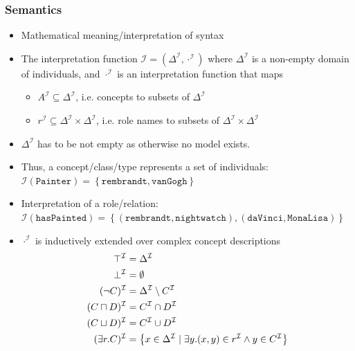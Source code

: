 \subsubsection{Semantics}
\begin{itemize}
	\item Mathematical meaning/interpretation of syntax
	\item The interpretation function $\mathcal{I}=\left(\Delta^{\mathcal{I}}, \cdot^{\mathcal{I}} \right)$ where $\Delta^{\mathcal{I}}$ is a non-empty domain of individuals, and $\cdot^{\mathcal{I}}$ is an interpretation function that maps
	\begin{itemize}
		\item $A^{\mathcal{I}} \subseteq \Delta^{\mathcal{I}}$, i.e. concepts to subsets of $\Delta^{\mathcal{I}}$
		\item $r^{\mathcal{I}} \subseteq \Delta^{\mathcal{I}}\times \Delta^{\mathcal{I}}$, i.e. role names to subsets of $\Delta^{\mathcal{I}}\times\Delta^{\mathcal{I}}$
	\end{itemize}
	\item $\Delta^{\mathcal{I}}$ has to be not empty as otherwise no model exists. 
	\item Thus, a concept/class/type represents a set of individuals: $\mathcal{I}(\texttt{Painter}) = \left\{\texttt{rembrandt}, \texttt{vanGogh}\right\}$
	\item Interpretation of a role/relation: $\mathcal{I}(\texttt{hasPainted}) = \left\{(\texttt{rembrandt}, \texttt{nightwatch}),(\texttt{daVinci}, \texttt{MonaLisa}) \right\}$ 
	\item $\cdot^{\mathcal{I}}$ is inductively extended over complex concept descriptions
	\begin{equation*}
		\begin{split}
			\top^{\mathcal{I}} & = \Delta^{\mathcal{I}}\\
			\bot^{\mathcal{I}} & = \emptyset\\
			(\lnot C)^{\mathcal{I}} & = \Delta^{\mathcal{I}}\setminus C^{\mathcal{I}}\\
			(C\sqcap D)^{\mathcal{I}} & = C^{\mathcal{I}} \cap D^{\mathcal{I}}\\
			(C\sqcup D)^{\mathcal{I}} & = C^{\mathcal{I}} \cup D^{\mathcal{I}}\\
			(\exists r.C)^{\mathcal{I}} & = \left\{x\in \Delta^{\mathcal{I}}\hspace{1mm}|\hspace{1mm}\exists y.(x,y)\in r^{\mathcal{I}} \wedge y\in C^{\mathcal{I}} \right\}\\

\end{split}
\end{equation*}
\end{itemize}
